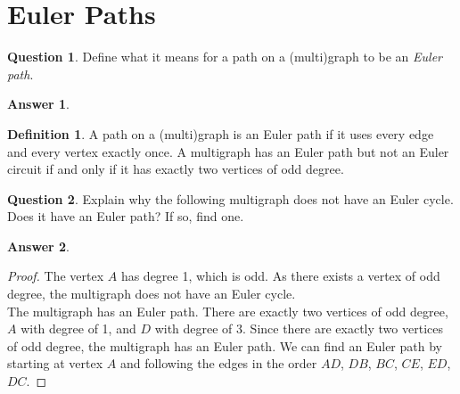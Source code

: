 \documentclass[article, 12pt]{article}
\theoremstyle{definition}
\newtheorem{definition}{Definition}
\newtheorem{question}{Question}
\newtheorem{answer}{Answer}
\begin{document}
    \section{Euler Paths}
    \begin{question}
        Define what it means for a path on a (multi)graph to be an \textit{Euler path}.
    \end{question}
    \begin{answer}
        \begin{definition}
            A path on a (multi)graph is an Euler path if it uses every edge and every vertex exactly once. A multigraph has an Euler path but not an Euler circuit if and only if it has exactly two vertices of odd degree.
        \end{definition}
    \end{answer}
    \begin{question}
        Explain why the following multigraph does not have an Euler cycle. Does it have an Euler path? If so, find one.
        \begin{figure}[H]
            \centering
        \end{figure}
    \end{question}
    \begin{answer}
        \begin{proof}
             The vertex $A$ has degree 1, which is odd. As there exists a vertex of odd degree, the multigraph does not have an Euler cycle.
            \\[12pt]
            The multigraph has an Euler path. There are exactly two vertices of odd degree, $A$ with degree of 1, and $D$ with degree of 3. Since there are exactly two vertices of odd degree, the multigraph has an Euler path. We can find an Euler path by starting at vertex $A$ and following the edges in the order $AD$, $DB$, $BC$, $CE$, $ED$, $DC$.
        \end{proof}
    \end{answer}
\end{document}
